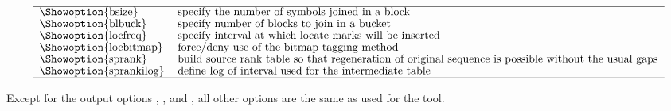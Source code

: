\documentclass[12pt,titlepage]{article}
\newcommand{\packedindex}{\textit{packedindex}\xspace}
\begin{document}
\begin{table}[htbp]
\caption{Overview of the \packedindex {} options.}
\begin{footnotesize}
\[
\renewcommand{\arraystretch}{0.89}
\begin{tabular}{ll}\hline
\Showoption{bsize}& specify the number of symbols joined in a block
\\
\Showoption{blbuck}& specify number of blocks to join in a bucket
\\
\Showoption{locfreq}& specify interval at which locate marks will be inserted
\\
\Showoption{locbitmap}& force/deny use of the bitmap tagging method
\\
\Showoption{sprank}& build source rank table so that regeneration of
original sequence is possible without the usual gaps
\\
\Showoption{sprankilog}& define log of interval used for the
intermediate table
\\
\hline
\end{tabular}
%
\]
\end{footnotesize}
\label{tab:packedindex:mkindex:options}
\end{table}

Except for the output options , , and
, all other options are the same as used for the
 tool.
\end{document}
